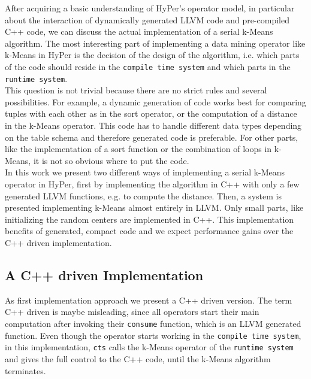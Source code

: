 After acquiring a basic understanding of HyPer’s operator model, in particular about the interaction of dynamically generated LLVM code and pre-compiled C++ code, we can discuss the actual implementation of a serial k-Means algorithm. The most interesting part of implementing a data mining operator like k-Means in HyPer is the decision of the design of the algorithm, i.e. which parts of the code should reside in the \texttt{compile time system} and which parts in the \texttt{runtime system}. 
\\
This question is not trivial because there are no strict rules and several possibilities. For example, a dynamic generation of code works best for comparing tuples with each other as in the sort operator, or the computation of a distance in the k-Means operator. This code has to handle different data types depending on the table schema and therefore generated code is preferable. For other parts, like the implementation of a sort function or the combination of loops in k-Means, it is not so obvious where to put the code.
\\
In this work we present two different ways of implementing a serial k-Means operator in HyPer, first by implementing the algorithm in C++ with only a few generated LLVM functions, e.g. to compute the distance. Then, a system is presented implementing k-Means almost entirely in LLVM. Only small parts, like initializing the random centers are implemented in C++. This implementation benefits of generated, compact code and we expect performance gains over the C++ driven implementation.


\subsection{A C++ driven Implementation}

As first implementation approach we present a C++ driven version. The term C++ driven is maybe misleading, since all operators start their main computation after invoking their \texttt{consume} function, which is an LLVM generated function. Even though the operator starts working in the \texttt{compile time system}, in this implementation, \texttt{cts} calls the k-Means operator of the \texttt{runtime system} and gives the full control to the C++ code, until the k-Means algorithm terminates. 

